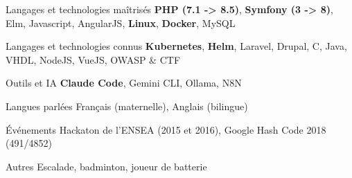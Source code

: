 
\begin{cvskills}

	\cvskill
	{Langages et technologies maîtrisés} %
	{\textbf{PHP (7.1 -> 8.5)}, \textbf{Symfony (3 -> 8)}, Elm, Javascript, AngularJS, \textbf{Linux}, \textbf{Docker}, MySQL} %

	\cvskill
	{Langages et technologies connus} %
	{\textbf{Kubernetes}, \textbf{Helm}, Laravel, Drupal, C, Java, VHDL, NodeJS, VueJS, OWASP \& CTF} %

	\cvskill
	{Outils et IA} %
	{\textbf{Claude Code}, Gemini CLI, Ollama, N8N}

	\cvskill
	{Langues parlées} %
	{Français (maternelle), Anglais (bilingue)} %

	\cvskill
	{Événements} %
	{Hackaton de l'ENSEA (2015 et 2016), Google Hash Code 2018 (491/4852)} %

	\cvskill
	{Autres} %
	{Escalade, badminton, joueur de batterie} %

\end{cvskills}
